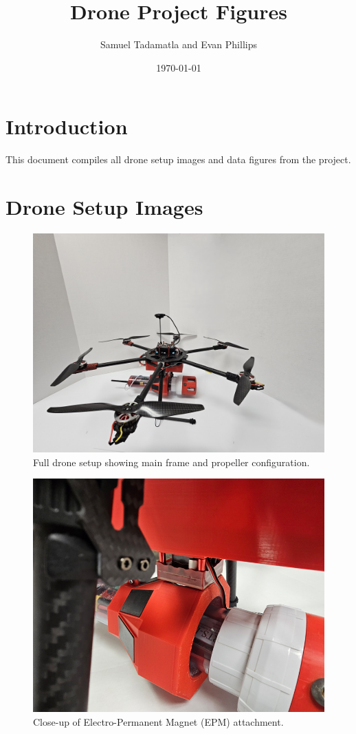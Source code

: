 \documentclass{article}
\title{Drone Project Figures}
\author{Samuel Tadamatla and Evan Phillips}
\date{\today}
\begin{document}
	
	\maketitle
	
	\section{Introduction}
	This document compiles all drone setup images and data figures from the project.
	
	\section{Drone Setup Images}
	
	\begin{figure}[H]
		\centering
		\includegraphics[width=5.0in]{figures/Figure1_Drone.jpg}
		\caption{Full drone setup showing main frame and propeller configuration.}
		\label{fig:Figure1_Drone}
	\end{figure}
	
	\begin{figure}[H]
		\centering
		\includegraphics[width=4.5in]{figures/Figure2_EPM.png}
		\caption{Close-up of Electro-Permanent Magnet (EPM) attachment.}
		\label{fig:Figure2_EMP}
	\end{figure}
	
\end{document}
